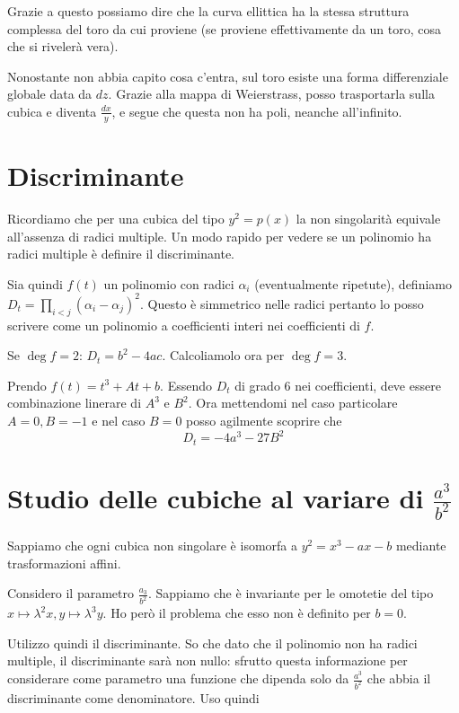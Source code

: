 	Grazie a questo possiamo dire che la curva ellittica ha la stessa struttura complessa del toro da cui proviene (se proviene effettivamente da un toro, cosa che si rivelerà vera).
	
	\begin{osservazione}
		Nonostante non abbia capito cosa c'entra, sul toro esiste una forma differenziale globale data da $dz$. Grazie alla mappa di Weierstrass, posso trasportarla sulla cubica e diventa $\frac{dx}y$, e segue che questa non ha poli, neanche all'infinito.
	
	\end{osservazione}
	
	\section{Discriminante}
	
	Ricordiamo che per una cubica del tipo $y^2=p(x)$ la non singolarità equivale all'assenza di radici multiple. Un modo rapido per vedere se un polinomio ha radici multiple è definire il discriminante.
	
	Sia quindi $f(t)$ un polinomio con radici $\alpha_i$ (eventualmente ripetute), definiamo $D_t=\prod_{i<j} (\alpha_i - \alpha_j)^2$. Questo è simmetrico nelle radici pertanto lo posso scrivere come un polinomio a coefficienti interi nei coefficienti di $f$.
	
	Se $\deg f=2$: $D_t= b^2-4ac$. Calcoliamolo ora per $\deg f=3$.

	Prendo $f(t)=t^3+At+b$. Essendo $D_t$ di grado 6 nei coefficienti, deve essere combinazione linerare di $A^3$ e $B^2$. Ora mettendomi nel caso particolare $A=0,B=-1$ e nel caso $B=0$ posso agilmente scoprire che 
	\[
		D_t=-4a^3-27B^2
	\]
	
	\section{Studio delle cubiche al variare di $\frac{a^3}{b^2}$}
	
	Sappiamo che ogni cubica non singolare è isomorfa a $y^2=x^3-ax-b$ mediante trasformazioni affini.
	
	Considero il parametro $\frac{a_3}{b^2}$. Sappiamo che è invariante per le omotetie del tipo $x\mapsto \lambda^2x, y\mapsto\lambda^3y$. Ho però il problema che esso non è definito per $b=0$.

	Utilizzo quindi il discriminante. So che dato che il polinomio non ha radici multiple, il discriminante sarà non nullo: sfrutto questa informazione per considerare come parametro una funzione che dipenda solo da $\frac{a^3}{b^2}$ che abbia il discriminante come denominatore. Uso quindi
	
